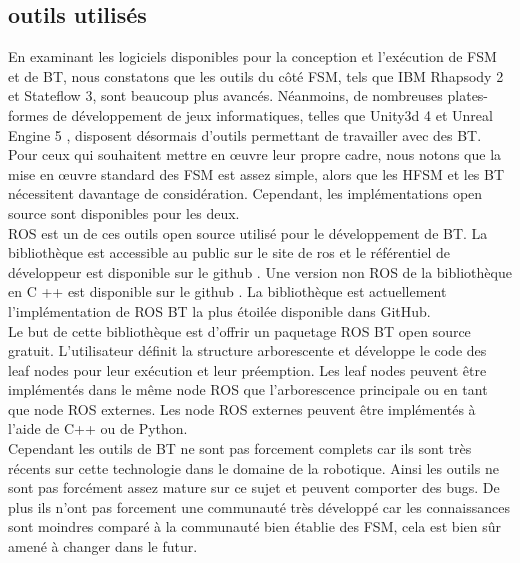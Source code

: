\documentclass[titlepage]{article}
\begin{document}
		\subsection{outils utilisés}
			En examinant les logiciels disponibles pour la conception et l'exécution de FSM et de BT, nous constatons que les outils du côté FSM, tels que IBM Rhapsody 2 et Stateflow 3, sont beaucoup plus avancés. Néanmoins, de nombreuses plates-formes de développement de jeux informatiques, telles que Unity3d 4\cite{technologies} et Unreal Engine 5 \cite{unreal_engine}, disposent désormais d'outils permettant de travailler avec des BT. Pour ceux qui souhaitent mettre en œuvre leur propre cadre, nous notons que la mise en œuvre standard des FSM est assez simple, alors que les HFSM et les BT nécessitent davantage de considération. Cependant, les implémentations open source sont disponibles pour les deux.
			\\
			ROS est un de ces outils open source utilisé pour le développement de BT.
			La bibliothèque est accessible au public sur le site de ros \cite{ros.org} et le référentiel de développeur est disponible sur le github \cite{miccol_2018_dev}. Une version non ROS de la bibliothèque en C ++ est disponible sur le github \cite{miccol_2018}. La bibliothèque est actuellement l’implémentation de ROS BT la plus étoilée disponible dans GitHub.
			\\
			Le but de cette bibliothèque est d’offrir un paquetage ROS BT open source gratuit. L'utilisateur définit la structure arborescente et développe le code des leaf nodes pour leur exécution et leur préemption. Les leaf nodes peuvent être implémentés dans le même node ROS que l'arborescence principale ou en tant que node ROS externes. Les node ROS externes peuvent être implémentés à l'aide de C++ ou de Python.
			\\
			Cependant les outils de BT ne sont pas forcement complets car ils sont très récents sur cette technologie dans le domaine de la robotique. Ainsi les outils ne sont pas forcément assez mature sur ce sujet et peuvent comporter des bugs. De plus ils n'ont pas forcement une communauté très développé car les connaissances sont moindres comparé à la communauté bien établie des FSM, cela est bien sûr amené à changer dans le futur.
\end{document}
